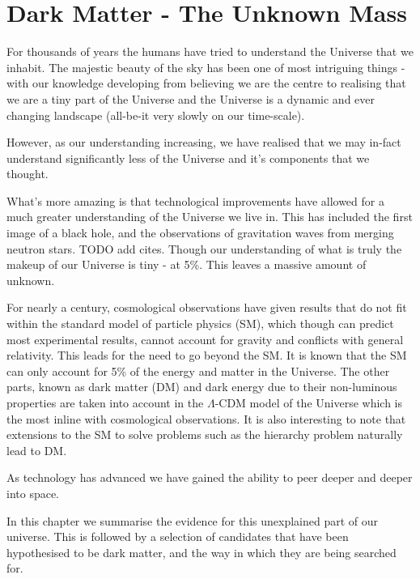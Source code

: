 \chapter{Dark Matter - The Unknown Mass}
\label{chap:dark_matter_evidence}

\par
For thousands of years the humans have tried to understand the Universe that we inhabit.
The majestic beauty of the sky has been one of most intriguing things - with our knowledge developing from believing we are the centre to realising that we are a tiny part of the Universe and the Universe is a dynamic and ever changing landscape (all-be-it very slowly on our time-scale).

\par
However, as our understanding increasing, we have realised that we may in-fact understand significantly less of the Universe and it's components that we thought.

What's more amazing is that technological improvements have allowed for a much greater understanding of the Universe we live in.
This has included the first image of a black hole, and the observations of gravitation waves from merging neutron stars. 
TODO add cites.
Though our understanding of what is truly the makeup of our Universe is tiny - at 5\%. 
This leaves a massive amount of unknown.

For nearly a century, cosmological observations have given results that do not fit within the standard model of particle physics (SM), which though can predict most experimental results, cannot account for gravity and conflicts with general relativity. 
This leads for the need to go beyond the SM. It is known that the SM can only account for 5\% of the energy and matter in the Universe. 
The other parts, known as dark matter (DM) and dark energy due to their non-luminous properties are taken into account in the $\Lambda$-CDM model of the Universe which is the most inline with cosmological observations.
It is also interesting to note that extensions to the SM to solve problems such as the hierarchy problem naturally lead to DM.


\par
As technology has advanced we have gained the ability to peer deeper and deeper into space.

\par
In this chapter we summarise the evidence for this unexplained part of our universe.
This is followed by a selection of candidates that have been hypothesised to be dark matter, and the way in which they are being searched for.




